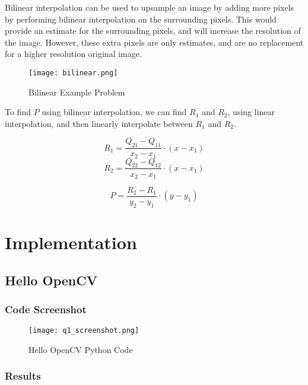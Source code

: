 \documentclass[12pt, letterpaper]{article}
\begin{document}
Bilinear interpolation can be used to upsample an image by adding more pixels by performing bilinear interpolation on the surrounding pixels. This would provide an estimate for the surrounding pixels, and will increase the resolution of the image. However, these extra pixels are only estimates, and are no replacement for a higher resolution original image.






\begin{figure}[h]
    \centering
    \texttt{[image: bilinear.png]}
    \caption{Bilinear Example Problem}
    \label{fig:bilinear}
\end{figure}



To find $P$ using bilinear interpolation, we can find $R_1$ and $R_2$, using linear interpolation, and then linearly interpolate between $R_1$ and $R_2$.

\[R_1 = \frac{Q_{21} - Q_{11}}{x_2-x_1} \cdot (x - x_1)  \]
\[R_2 = \frac{Q_{22} - Q_{12}}{x_2-x_1} \cdot (x - x_1)  \]

\[P = \frac{R_2 - R_1}{y_2-y_1} \cdot (y - y_1)  \]


\section{Implementation}

\subsection{Hello OpenCV}

\subsubsection{Code Screenshot}
\begin{figure}[H]
    \centering
    \texttt{[image: q1\_screenshot.png]}
    \caption{Hello OpenCV Python Code}
\end{figure}

\subsubsection{Results}
\end{document}
